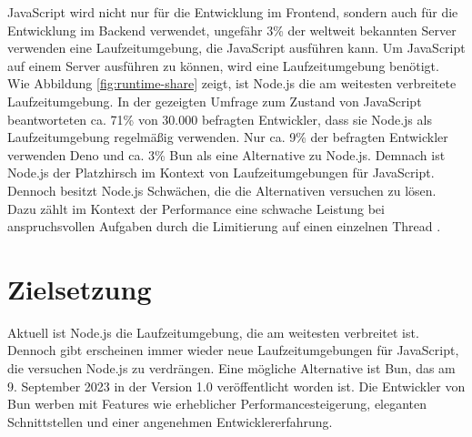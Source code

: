 \noindent
JavaScript wird nicht nur für die Entwicklung im Frontend, sondern auch für die Entwicklung im Backend 
verwendet, ungefähr 3\% der weltweit bekannten Server verwenden eine Laufzeitumgebung, die JavaScript 
ausführen kann. \cite{QSuccess.2023} Um JavaScript auf einem Server ausführen zu können, wird eine Laufzeitumgebung benötigt. Wie Abbildung \ref{fig:runtime-share} zeigt, ist Node.js die am weitesten verbreitete Laufzeitumgebung. In der gezeigten Umfrage zum Zustand von JavaScript beantworteten ca. 71\% von 30.000 befragten Entwickler, dass sie Node.js als Laufzeitumgebung regelmäßig verwenden.
Nur ca. 9\% der befragten Entwickler verwenden Deno und ca. 3\% Bun als eine Alternative zu Node.js. \cite{Greif.2022} \newline
Demnach ist Node.js der Platzhirsch im Kontext von Laufzeitumgebungen für JavaScript. Dennoch besitzt Node.js Schwächen, die die Alternativen versuchen zu lösen. Dazu zählt im Kontext der Performance eine schwache Leistung bei anspruchsvollen
Aufgaben durch die Limitierung auf einen einzelnen Thread \cite{Chhetri.2016}.


\section{Zielsetzung}
Aktuell ist Node.js die Laufzeitumgebung, die am weitesten verbreitet ist. Dennoch gibt erscheinen immer wieder neue Laufzeitumgebungen für JavaScript, die versuchen Node.js zu verdrängen. Eine mögliche Alternative ist Bun, das am 9. September 2023 in der Version 1.0 veröffentlicht worden ist. Die Entwickler von Bun werben mit Features wie erheblicher Performancesteigerung, eleganten Schnittstellen und einer angenehmen Entwicklererfahrung. \cite{Sumner.2023} \\

